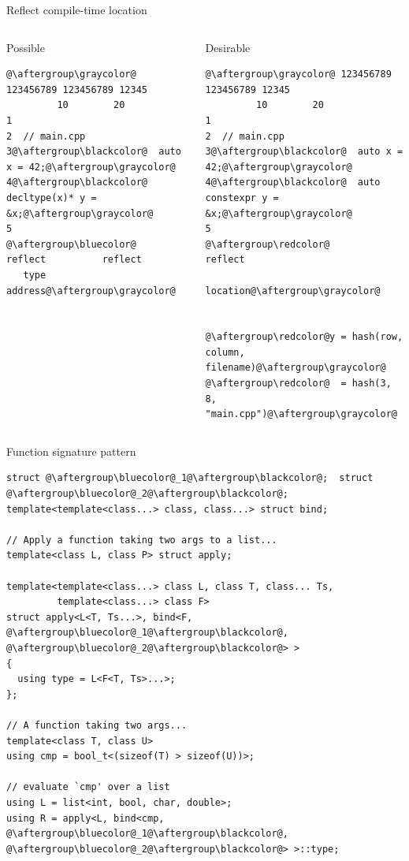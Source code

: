 \documentclass[xcolor=dvipsnames]{beamer}
\begin{document}
\begin{frame}[fragile]{Reflect compile-time location}
  \begin{columns}[T] %
    \begin{column}{0.47\textwidth}
\begin{center}Possible\end{center}
  \begin{lstlisting}
@\aftergroup\graycolor@ 123456789 123456789 12345
         10        20
1
2  // main.cpp
3@\aftergroup\blackcolor@  auto x = 42;@\aftergroup\graycolor@
4@\aftergroup\blackcolor@  decltype(x)* y = &x;@\aftergroup\graycolor@
5
@\aftergroup\bluecolor@   reflect          reflect
   type             address@\aftergroup\graycolor@
  \end{lstlisting}
    \end{column}%
    \hfill%
    \begin{column}{0.53\textwidth}
\begin{center}Desirable\end{center}
 \begin{lstlisting}
@\aftergroup\graycolor@ 123456789 123456789 12345
         10        20
1
2  // main.cpp
3@\aftergroup\blackcolor@  auto x = 42;@\aftergroup\graycolor@
4@\aftergroup\blackcolor@  auto constexpr y = &x;@\aftergroup\graycolor@
5
@\aftergroup\redcolor@                      reflect
                      location@\aftergroup\graycolor@


@\aftergroup\redcolor@y = hash(row, column, filename)@\aftergroup\graycolor@
@\aftergroup\redcolor@  = hash(3, 8, "main.cpp")@\aftergroup\graycolor@

 \end{lstlisting}
    \end{column}%
  \end{columns}
\end{frame}


\begin{frame}[fragile]{Function signature pattern}
\begin{lstlisting}
struct @\aftergroup\bluecolor@_1@\aftergroup\blackcolor@;  struct @\aftergroup\bluecolor@_2@\aftergroup\blackcolor@;
template<template<class...> class, class...> struct bind;

// Apply a function taking two args to a list...
template<class L, class P> struct apply;

template<template<class...> class L, class T, class... Ts,
         template<class...> class F>
struct apply<L<T, Ts...>, bind<F, @\aftergroup\bluecolor@_1@\aftergroup\blackcolor@, @\aftergroup\bluecolor@_2@\aftergroup\blackcolor@> >
{
  using type = L<F<T, Ts>...>;
};

// A function taking two args...
template<class T, class U>
using cmp = bool_t<(sizeof(T) > sizeof(U))>;

// evaluate `cmp' over a list
using L = list<int, bool, char, double>;
using R = apply<L, bind<cmp, @\aftergroup\bluecolor@_1@\aftergroup\blackcolor@, @\aftergroup\bluecolor@_2@\aftergroup\blackcolor@> >::type;
\end{lstlisting}
\end{frame}
\end{document}
